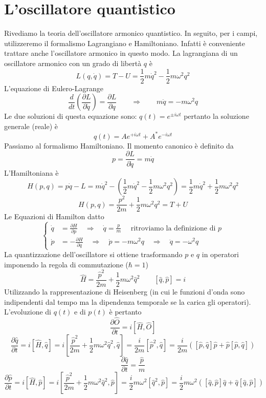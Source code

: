 \section{L'oscillatore quantistico}
Rivediamo la teoria dell'oscillatore armonico quantistico. In seguito, per i campi, utilizzeremo il formalismo Lagrangiano e Hamiltoniano. Infatti è conveniente trattare anche l'oscillatore armonico in questo modo. La lagrangiana di un oscillatore armonico con un grado di libertà $q$ è 
$$
L(q, \dot{q}) = T - U = \frac{1}{2}m\dot{q}^2 - \frac{1}{2}m\omega^2 q^2
$$
L'equazione di Eulero-Lagrange
$$
\frac{d}{dt} \left( \frac{\partial L}{\partial \dot{q}} \right) = \frac{\partial L}{\partial q} \qquad \Longrightarrow \qquad m\ddot{q} = -m\omega^2 q
$$
Le due soluzioni di questa equazione sono: $q(t)=e^{\pm i\omega t}$ pertanto la soluzione generale (reale) è
$$
q(t) = A e^{+i\omega t} + A^* e^{-i\omega t}
$$
Passiamo al formalismo Hamiltoniano. Il momento canonico è definito da
$$
p = \frac{\partial L}{\partial \dot{q}} = m\dot{q}
$$
L'Hamiltoniana è
$$
H(p,q) = p\dot{q} - L = m\dot{q}^2 - \left( \frac{1}{2}m\dot{q}^2 - \frac{1}{2}m\omega^2 q^2 \right) = \frac{1}{2}m\dot{q}^2 + \frac{1}{2}m\omega^2 q^2
$$
$$
H(p,q) = \frac{p^2}{2m} + \frac{1}{2}m\omega^2 q^2 = T + U
$$
Le Equazioni di Hamilton datto
$$
\left\{
\begin{aligned}
\dot{q} &= \frac{\partial H}{\partial p} \quad \Rightarrow\quad \dot{q} = \frac{p}{m} \quad \text{ ritroviamo la definizione di }p
 \\
\dot{p} &= -\frac{\partial H}{\partial q}\quad \Rightarrow\quad \dot{p} = -m\omega^2 q \quad \Rightarrow\quad \ddot{q} = -\omega^2 q
\end{aligned}
\right.
$$
La quantizzazione dell'oscillatore si ottiene trasformando $p$ e $q$ in operatori imponendo la regola di commutazione ($\hbar=1$)
$$
\hat{H} = \frac{\hat{p}^2}{2m} + \frac{1}{2}m\omega^2\hat{q}^2 \qquad [\hat{q}, \hat{p}] = i
$$
Utilizzando la rappresentazione di Heisenberg (in cui le funzioni d'onda sono indipendenti dal tempo ma la dipendenza temporale se la carica gli operatori). L'evoluzione di $q(t)$ e di $p(t)$ è pertanto
$$
\frac{\partial\hat{O}}{\partial t} = i[\hat{H}, \hat{O}]
$$
$$
\frac{\partial\hat{q}}{\partial t} = i[\hat{H}, \hat{q}] = i\left[ \frac{\hat{p}^2}{2m} + \frac{1}{2}m\omega^2\hat{q}^2, \hat{q} \right] = \frac{i}{2m} [\hat{p}^2, \hat{q}] = \frac{i}{2m} ([\hat{p}, \hat{q}]\hat{p} + \hat{p}[\hat{p}, \hat{q}])
$$
$$
\frac{\partial\hat{q}}{\partial t} = \frac{\hat{p}}{m}
$$
$$
\frac{\partial\hat{p}}{\partial t} = i[\hat{H}, \hat{p}] = i\left[ \frac{\hat{p}^2}{2m} + \frac{1}{2}m\omega^2\hat{q}^2, \hat{p} \right] = \frac{i}{2}m\omega^2 [\hat{q}^2, \hat{p}] = \frac{i}{2}m\omega^2 ([\hat{q}, \hat{p}]\hat{q} + \hat{q}[\hat{q}, \hat{p}])
$$
